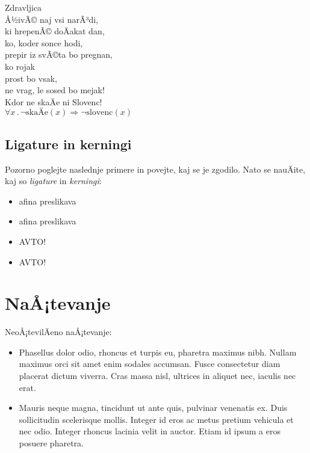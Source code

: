 \documentclass[a4paper]{article}
\begin{document}
\begin{center}
{\Huge Zdravljica} \\
{\Huge Å½ivÃ© naj vsi narÃ³di,} \\
{\huge ki hrepenÃ© doÄakat dan,} \\
{\LARGE ko, koder sonce hodi,} \\
{\Large prepir iz svÃ©ta bo pregnan,} \\
{\large ko rojak} \\
{\normalsize prost bo vsak,} \\
{\footnotesize ne vrag, le sosed bo mejak!} \\
{\scriptsize Kdor ne skaÄe ni Slovenc!} \\
{\tiny $\forall x \,.\, \lnot\mathrm{skaÄe}(x) \Rightarrow \lnot\mathrm{slovenc}(x)$}
\end{center}

\subsection{Ligature in kerningi}

Pozorno poglejte naslednje primere in povejte, kaj se je zgodilo. Nato se nauÄite, kaj so
\emph{ligature} in \emph{kerningi}:
%
\begin{itemize}
\item afina preslikava
\item {a}{f}{i}{n}{a} preslikava
\item AVTO!
\item {A}{V}{T}{O}!
\end{itemize}


\section{NaÅ¡tevanje}

NeoÅ¡tevilÄeno naÅ¡tevanje:
%
\begin{itemize}

\item Phasellus dolor odio, rhoncus et turpis eu, pharetra maximus nibh. Nullam maximus
  orci sit amet enim sodales accumsan. Fusce consectetur diam placerat dictum viverra.
  Cras massa nisl, ultrices in aliquet nec, iaculis nec erat.

\item Mauris neque magna, tincidunt ut ante quis, pulvinar venenatis ex. Duis sollicitudin
  scelerisque mollis. Integer id eros ac metus pretium vehicula et nec odio. Integer
  rhoncus lacinia velit in auctor. Etiam id ipsum a eros posuere pharetra.
\end{itemize}
\end{document}
